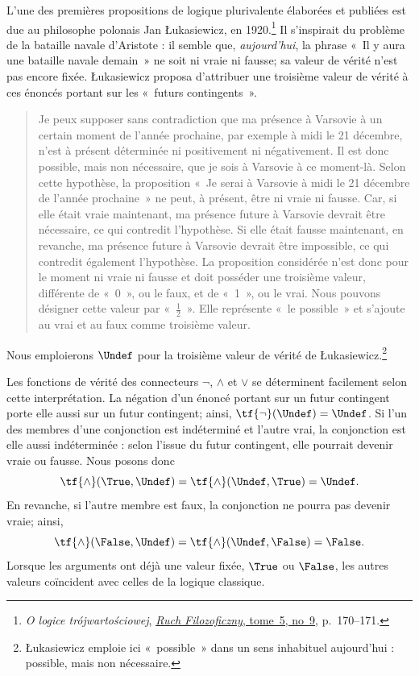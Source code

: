 \documentclass[../../../include/open-logic-section]{subfiles}
\begin{document}


L'une des premières propositions de
logique plurivalente élaborées et
publiées est due au philosophe
polonais Jan \L ukasiewicz, en 1920.\footnote{\emph{O logice trójwartościowej},
\href{https://kpbc.umk.pl/dlibra/publication/250664/edition/247342}{\emph{Ruch Filozoficzny}, tome~5, no~9}, p.~170--171.}
Il s'inspirait du problème de la
bataille navale d'Aristote : il semble
que, \emph{aujourd'hui}, la phrase
«~Il y aura une bataille navale demain~»
ne soit ni vraie ni fausse; sa valeur
de vérité n'est pas encore fixée.
\L ukasiewicz proposa d'attribuer
une troisième valeur de vérité à ces
énoncés portant sur les «~futurs
contingents~».
\begin{quote}
Je peux supposer sans contradiction
que ma présence à Varsovie à un certain
moment de l'année prochaine, par exemple
à midi le 21 décembre, n'est à présent
déterminée ni positivement ni négativement.
Il est donc possible, mais non nécessaire,
que je sois à Varsovie à ce moment-là.
Selon cette hypothèse, la proposition
«~Je serai à Varsovie à midi le 21 décembre
de l'année prochaine~» ne peut, à présent,
être ni vraie ni fausse. Car, si elle
était vraie maintenant, ma présence
future à Varsovie devrait être nécessaire,
ce qui contredit l'hypothèse. Si elle
était fausse maintenant, en revanche,
ma présence future à Varsovie devrait
être impossible, ce qui contredit
également l'hypothèse. La proposition
considérée n'est donc pour le moment
ni vraie ni fausse et doit posséder
une troisième valeur, différente de
«~0~», ou le faux, et de «~1~», ou le
vrai. Nous pouvons désigner cette
valeur par «~$\frac{1}{2}$~».
Elle représente «~le possible~» et
s'ajoute au vrai et au faux comme
troisième valeur.
\end{quote}
Nous emploierons $\Undef$ pour la
troisième valeur de vérité de
\L ukasiewicz.\footnote{\L ukasiewicz
emploie ici «~possible~» dans un sens
inhabituel aujourd'hui : possible,
mais non nécessaire.}

Les fonctions de vérité des connecteurs
$\lnot$, $\land$ et $\lor$ se
déterminent facilement selon cette
interprétation. La négation d'un
énoncé portant sur un futur contingent
porte elle aussi sur un futur contingent;
ainsi, $\tf{\lnot}(\Undef)=\Undef$.
Si l'un des membres d'une conjonction
est indéterminé et l'autre vrai,
la conjonction est elle aussi
indéterminée : selon l'issue du futur
contingent, elle pourrait devenir
vraie ou fausse. Nous posons donc
\[
  \tf{\land}(\True,\Undef)
  =\tf{\land}(\Undef,\True)
  =\Undef.
\]
En revanche, si l'autre membre est
faux, la conjonction ne pourra pas
devenir vraie; ainsi,
\[
  \tf{\land}(\False,\Undef)
  =\tf{\land}(\Undef,\False)
  =\False.
\]
Lorsque les arguments ont déjà une
valeur fixée, $\True$ ou $\False$,
les autres valeurs coïncident avec
celles de la logique classique.
\end{document}
